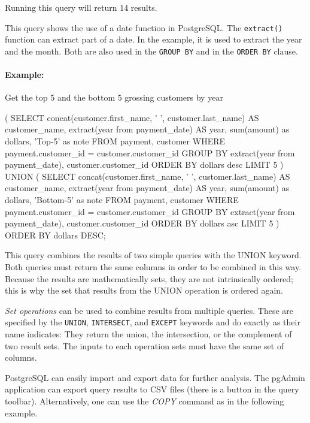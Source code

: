 Running this query will return 14 results.

This query shows the use of a date function in PostgreSQL. The \texttt{extract()} function can extract part of a date. In the example, it is used to extract the year and the month. Both are also used in the \texttt{GROUP BY} and in the \texttt{ORDER BY} clause. 

\paragraph*{Example:} Get the top 5 and the bottom 5 grossing customers by year


\begin{samepage}
\begin{sqlcode}
( SELECT concat(customer.first_name, ' ', 
                customer.last_name) AS customer_name,
       extract(year from payment_date) AS year, 
       sum(amount) as dollars,
       'Top-5' as note
FROM payment, customer
WHERE payment.customer_id = customer.customer_id
GROUP BY extract(year from payment_date),
         customer.customer_id
ORDER BY dollars desc
LIMIT 5
) UNION (
SELECT concat(customer.first_name, ' ', 
              customer.last_name) AS customer_name,
       extract(year from payment_date) AS year, 
       sum(amount) as dollars,
       'Bottom-5' as note
FROM payment, customer
WHERE payment.customer_id = customer.customer_id
GROUP BY extract(year from payment_date),
         customer.customer_id
ORDER BY dollars asc
LIMIT 5 ) ORDER BY dollars DESC;
\end{sqlcode}
\end{samepage}

This query combines the results of two simple queries with the UNION keyword. Both queries must return the same columns in order to be combined in this way. Because the results are mathematically sets, they are not intrinsically ordered; this is why the set that results from the UNION operation is ordered again.

\emph{Set operations} can be used to combine results from multiple queries. These are specified by the \texttt{UNION}, \texttt{INTERSECT}, and \texttt{EXCEPT} keywords and do exactly as their name indicates: They return the union, the intersection, or the complement of two result sets. The inputs to each operation sets must have the same set of columns.

PostgreSQL can easily import and export data for further analysis. The pgAdmin application can export query results to CSV files (there is a button in the query toolbar). Alternatively, one can use the \emph{COPY} command as in the following example.

